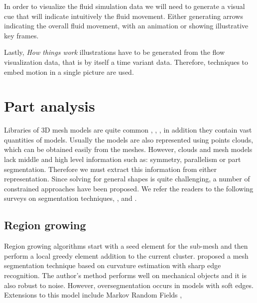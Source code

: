 In order to visualize the fluid simulation data we will need to generate a visual cue that will indicate intuitively the fluid movement.
Either generating arrows indicating the overall fluid movement, with an animation or showing illustrative key frames.

Lastly, \textit{How things work} illustrations have to be generated from the flow visualization data, that is by itself a time variant data.
Therefore, techniques to embed motion in a single picture are used.

\section{Part analysis}
\label{sec:partAnalysis}

Libraries of 3D mesh models are quite common \cite{Trimble2014}, \cite{GrabCAD2014}, \cite{Autodesk2014}, in addition they contain vast quantities of models.   
Usually the models are also represented using points clouds, which can be obtained easily from the meshes.
However, clouds and mesh models lack middle and high level information such as: symmetry, parallelism or part segmentation.
Therefore we must extract this information from either representation.
Since solving for general shapes is quite challenging, a number of constrained approaches have been proposed.
We refer the readers to the following surveys on segmentation techniques, \cite{Varady1997}, \cite{Agathos2007} and \cite{Shamir2008}.

\subsection{Region growing}

Region growing algorithms start with a seed element for the sub-mesh and then perform a local greedy element addition to the current cluster.
\cite{Mizoguchi2006} proposed a mesh segmentation technique based on curvature estimation with sharp edge recognition.
The author's method performs well on mechanical objects and it is also robust to noise.
However, oversegmentation occurs in models with soft edges.
Extensions to this model include Markov Random Fields \cite{Lavoue2008},


